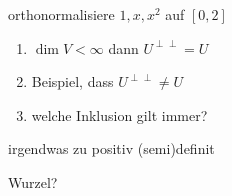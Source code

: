 \documentclass[a4,11pt]{article}
\begin{document}
\vspace*{-17mm}
{
\kopf
}



\begin{aufgabe}[4 Punkte]
orthonormalisiere $1,x,x^2$ auf $[0,2]$
\end{aufgabe}

\begin{aufgabe}[4 Punkte]
\begin{enumerate}
\item $\dim V < \infty$ dann $U^{\perp \perp} = U$
\item Beispiel, dass $U^{\perp \perp} \neq U$
\item welche Inklusion gilt immer?
\end{enumerate}
\end{aufgabe}

\begin{aufgabe}[4 Punkte]
  irgendwas zu positiv (semi)definit

  Wurzel?
\end{aufgabe}
\end{document}

